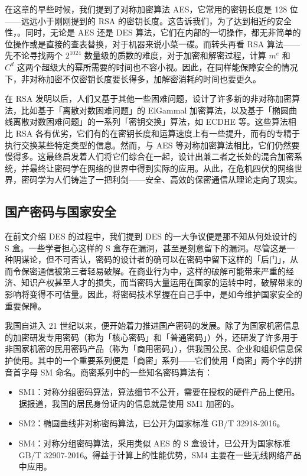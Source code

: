 在这章的早些时候，我们提到了对称加密算法 AES，它常用的密钥长度是 128 位——远远小于刚刚提到的 RSA 的密钥长度。这告诉我们，为了达到相近的安全性，。同时，无论是 AES 还是 DES 算法，它们在内部的一切操作，都无非简单的位操作或是直接的查表替换，对于机器来说小菜一碟。而转头再看 RSA 算法——先不论寻找两个 $2^{1024}$ 数量级的质数的难度，对于加密和解密过程，计算 $m^e$ 和 $C^d$ 这两个超级大的幂所需要的时间也不容小视。因此，在同样能保障安全的情况下，非对称加密不仅密钥长度要长得多，加解密消耗的时间也要更久。

在 RSA 发明以后，人们又基于其他一些困难问题，设计了许多新的非对称加密算法，比如基于「离散对数困难问题」的 ElGammal 加密算法，以及基于「椭圆曲线离散对数困难问题」的一系列「密钥交换」算法，如 ECDHE 等。这些算法相比 RSA 各有优劣，它们有的在密钥长度和运算速度上有一些提升，而有的专精于执行交换某些特定类型的信息。然而，与 AES 等对称加密算法相比，它们仍然要慢得多。这最终启发着人们将它们综合在一起，设计出兼二者之长处的混合加密系统，并最终让密码学在网络的世界中得到实际的应用。从此，在危机四伏的网络世界，密码学为人们铸造了一把利剑——安全、高效的保密通信从理论走向了现实。

\subsection{国产密码与国家安全}

在前文介绍 DES 的过程中，我们提到 DES 的一大争议便是那不知从何处设计的 S 盒。一些学者担心这样的 S 盒存在漏洞，甚至是刻意留下的漏洞。尽管这是一种阴谋论，但不可否认，密码的设计者的确可以在密码中留下这样的「后门」，从而令保密通信被第三者轻易破解。在商业行为中，这样的破解可能带来严重的经济、知识产权甚至人才的损失，而当密码大量运用在国家的运转中时，破解带来的影响将变得不可估量。因此，将密码技术掌握在自己手中，是如今维护国家安全的重要保障。

我国自进入 21 世纪以来，便开始着力推进国产密码的发展。除了为国家机密信息的加密研发专用密码（称为「核心密码」和「普通密码」）外，还研发了许多用于非国家机密的民用密码产品（称为「商用密码」），供我国公民、企业和组织信息保护使用。其中的一个重要系列便是「商密」系列——它们使用「商密」两个字的拼音首字母 SM 命名。商密系列中的一些知名密码算法有：

\begin{itemize}
  \item SM1：对称分组密码算法，算法细节不公开，需要在授权的硬件产品上使用。据报道，我国的居民身份证内的信息就是使用 SM1 加密的。
  \item SM2：椭圆曲线非对称密码算法，已公开为国家标准 GB/T 32918-2016。
  \item SM4：对称分组密码算法，采用类似 AES 的 S 盒设计，已公开为国家标准 GB/T 32907-2016。得益于计算上的性能优势，SM4 主要在一些无线网络产品中应用。
\end{itemize}


